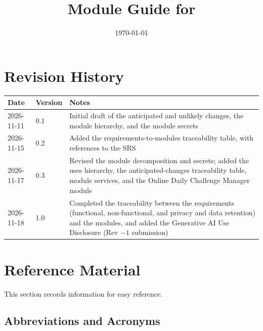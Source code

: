 \documentclass[12pt, titlepage]{article}
\begin{document}
\title{Module Guide for \progname{}} 
\author{\authname}
\date{\today}

\maketitle


\section{Revision History}

\begin{tabularx}{\textwidth}{p{3cm}p{2cm}X}
\toprule {\bf Date} & {\bf Version} & {\bf Notes}\\
\midrule
2026-11-11 & 0.1 & Initial draft of the anticipated and unlikely changes, the module hierarchy, and the module secrets\\
2026-11-15 & 0.2 & Added the requirements-to-modules traceability table, with references to the SRS\\
2026-11-17 & 0.3 & Revised the module decomposition and secrets; added the uses hierarchy, the anticipated-changes traceability table, module services, and the Online Daily Challenge Manager module\\
2026-11-18 & 1.0 & Completed the traceability between the requirements (functional, non-functional, and privacy and data retention) and the modules, and added the Generative AI Use Disclosure (Rev $-1$ submission)\\
\bottomrule
\end{tabularx}

\newpage

\section{Reference Material}

This section records information for easy reference. 

\subsection{Abbreviations and Acronyms}
\end{document}
